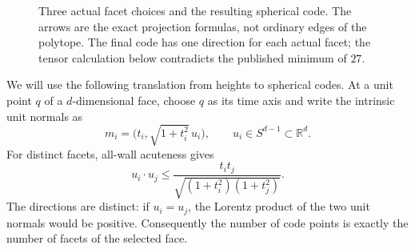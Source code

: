 \documentclass[11pt]{article}
\theoremstyle{remark}
\newcommand{\RR}{\mathbb R}
\newcommand{\ip}[2]{\langle #1,#2\rangle}
\begin{document}
\begin{figure}[t]
\centering
{}
\caption{Three actual facet choices and the resulting spherical code.
The arrows are the exact projection formulas, not ordinary edges of
the polytope. The final code has one direction for each actual facet;
the tensor calculation below contradicts the published minimum of $27$.}
\label{fig:ladder}
\end{figure}

We will use the following translation from heights to spherical codes.
At a unit point $q$ of a $d$-dimensional face, choose $q$ as its time
axis and write the intrinsic unit normals as
\begin{equation}\label{eq:split}
 m_i=\bigl(t_i,\sqrt{1+t_i^2}\,u_i\bigr),
 \qquad u_i\in S^{d-1}\subset\RR^d.
\end{equation}
For distinct facets, all-wall acuteness gives
\begin{equation}\label{eq:spatial}
 u_i\cdot u_j\le
 \frac{t_it_j}{\sqrt{(1+t_i^2)(1+t_j^2)}}.
\end{equation}
The directions are distinct: if $u_i=u_j$, the Lorentz product of
the two unit normals would be positive. Consequently the number of
code points is exactly the number of facets of the selected face.
\end{document}
